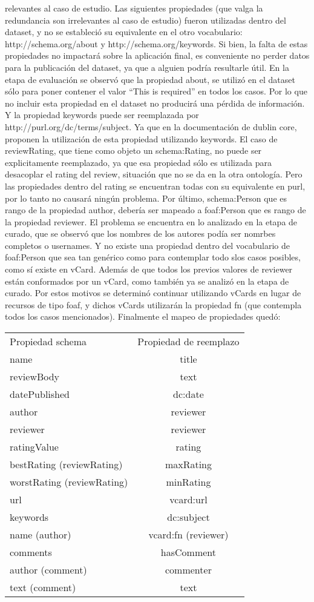 relevantes al caso de estudio. Las siguientes propiedades (que valga la redundancia son irrelevantes al caso de estudio) fueron utilizadas dentro del dataset, y 
no se estableció su equivalente en el otro vocabulario:
http://schema.org/about y http://schema.org/keywords. 
Si bien, la falta de estas propiedades no impactará sobre la aplicación final, es conveniente no perder datos para la publicación del dataset, ya que 
a alguien podría resultarle útil. 
En la etapa de evaluación se observó que la propiedad about, se utilizó en el dataset sólo para poner contener el valor ``This is required'' en todos los casos. 
Por lo que no incluir esta propiedad en el dataset no producirá una pérdida de información.
Y la propiedad keywords puede ser reemplazada por http://purl.org/dc/terms/subject. Ya que en la documentación de dublin core, proponen la utilización de esta propiedad 
utilizando keywords.
El caso de reviewRating, que tiene como objeto un schema:Rating, no puede ser explicitamente reemplazado, ya que esa propiedad 
sólo es utilizada para desacoplar el rating del review, situación que no se da en la otra ontología. Pero las propiedades dentro del rating se encuentran todas 
con su equivalente en purl, por lo tanto no causará ningún problema.
Por último, schema:Person que es rango de la propiedad author, debería ser mapeado a foaf:Person que es rango de la propiedad reviewer. 
El problema se encuentra en lo analizado en la etapa de curado, que se observó que los nombres de los autores podía ser nomrbes completos o usernames. 
Y no existe una propiedad dentro del vocabulario de foaf:Person que sea tan genérico como para contemplar todo slos casos posibles, como sí existe en vCard.
Además de que todos los previos valores de reviewer están conformados por un vCard, como también ya se analizó en la etapa de curado.
Por estos motivos se determinó continuar utilizando vCards en lugar de recursos de tipo foaf, y dichos vCards utilizarán la propiedad
fn (que contempla todos los casos mencionados).
Finalmente el mapeo de propiedades quedó:\\
\begin{tabular}{| l | c |}
Propiedad schema & Propiedad de reemplazo\\
name & title \\
reviewBody & text \\
datePublished & dc:date \\
author & reviewer \\
reviewer & reviewer \\
ratingValue & rating\\
bestRating (reviewRating) & maxRating\\
worstRating (reviewRating)& minRating\\
url & vcard:url\\
keywords & dc:subject\\
name (author) & vcard:fn (reviewer)\\
comments & hasComment\\
author (comment) & commenter \\
text (comment) & text 
\end{tabular}

